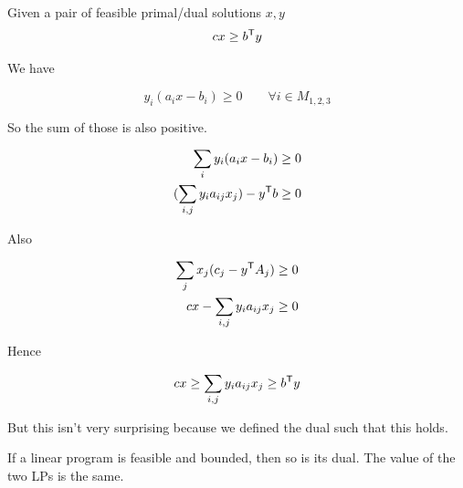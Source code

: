\begin{thm}\label{thm:weakDuality} Given a pair of feasible primal/dual solutions $x,y$
\[cx \geq  {b}^\text{\upshape \sffamily T} y\]
\end{thm}

\begin{pr} We have

\[y_i(a_ix-b_i) \geq 0 \qquad \forall i\in M_{1,2,3}\]


So the sum of those is also positive.

\begin{align*}
\sum_i y_i(a_ix-b_i) &\geq 0\\
(\sum_{i,j}y_ia_{ij}x_j)-{y}^\text{\upshape \sffamily T}b &\geq 0
\end{align*}

Also 

\begin{align*}
\sum_j x_j(c_j-{y}^\text{\upshape \sffamily T}A_j) & \geq 0\\
cx - \sum_{i,j} y_i a_{ij} x_j &\geq 0
\end{align*}

Hence

\[cx \geq \sum_{i,j} y_i a_{ij} x_j \geq {b}^\text{\upshape \sffamily T} y\]

But this isn't very surprising because we defined the dual such that this holds.
\end{pr}

\begin{thm}\label{thm:strongDuality} If a linear program is feasible and bounded, then so is its dual. The value of the two LPs is the same. \end{thm}

